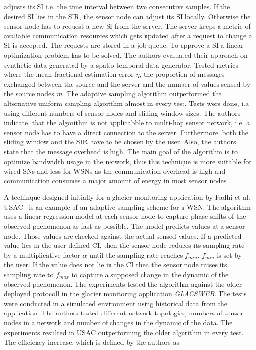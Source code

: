 adjusts its \ac{SI} i.e. the time interval between two consecutive samples. If
the desired \ac{SI} lies in the \ac{SIR}, the sensor node can adjust its
\ac{SI} locally. Otherwise the sensor node has to request a new \ac{SI} from
the server. The server keeps a metric of avaliable communication resources
which gets updated after a request to change a \ac{SI} is accepted. The
requests are stored in a job queue. To approve a \ac{SI} a linear optimization
problem has to be solved. The authors evaluated their approach on synthetic
data generated by a spatio-temporal data generator. Tested metrics where the
mean fractional estimation error $ \eta $, the proportion of messages exchanged
between the source and the server and the number of values sensed by the source
nodes \textit{m}. The adaptive sampling algorithm outperformed the alternative
uniform sampling algorithm almost in every test. Tests were done, i.a using
different numbers of sensor nodes and sliding window sizes. The authors
indicate, that the algorithm is not applicabble to multi-hop sensor network,
i.e. a sensor node has to have a direct connection to the server. Furthermore,
both the sliding window and the \ac{SIR} have to be chosen by the user. Also,
the authors state that the message overhead is high. The main goal of the
algorithm is to optimize bandwidth usage in the network, thus this technique is
more suitable for wired \acp{SN} and less for \acp{WSN} as the communication
overhead is high and communication consumes a major amount of energy in
most sensor nodes~\cite{raghunathan2002energy}.
\par
A techinque designed initially for a glacier monitoring application by Padhi et
al. \ac{USAC}~\cite{padhy2006utility} is an example of an adaptive sampling
scheme for a \ac{WSN}. The algorithm uses a linear regression model at each
sensor node to capture phase shifts of the observed phenomenon as fast as
possible. The model predicts values at a sensor node. Those values are checked
against the actual sensed values. If a predicted value lies in the user defined
\ac{CI}, then the sensor node reduces its sampling rate by a multiplicative
factor $ \alpha $ until the sampling rate reaches $ f_{min} $. $ f_{min} $ is
set by the user. If the value does not lie in the \ac{CI} then the sensor node
raises its sampling rate to $ f_{max} $ to capture a supposed change in the
dynamic of the observed phenomenon. The experiments tested the algorithm
against the older deployed protocoll in the glacier monitoring application
\textit{GLACSWEB}. The tests were conducted in a simulated environment using
historical data from the application. The authors tested different network
topologies, numbers of sensor nodes in a network and number of changes in the
dynamic of the data. The experiments resulted in \ac{USAC} outperforming the
older algorithm in every test. The efficiency increase, which is defined by the
authors as

